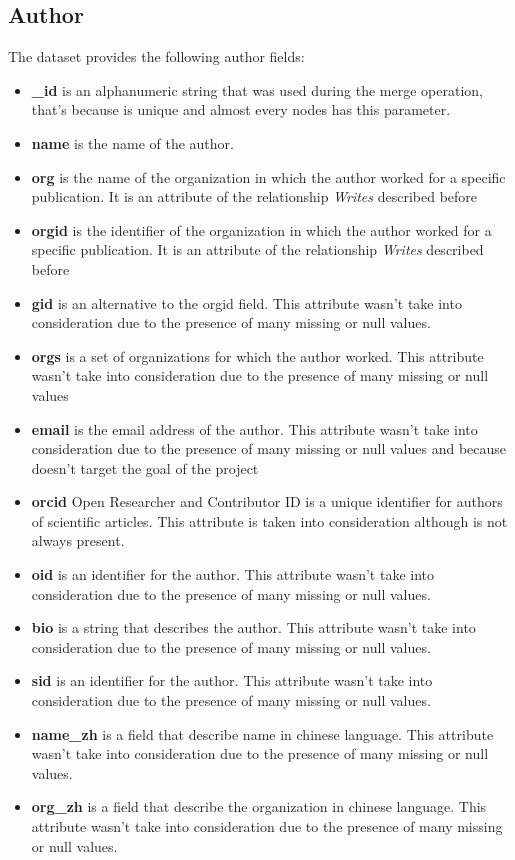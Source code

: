 \documentclass{Configuration_Files/PoliMi3i_thesis}
\begin{document}
\subsection{Author}
The dataset provides the following author fields:
\begin{itemize}
    \item \textbf{\_id} is an alphanumeric string that was used during the merge operation, that's because is unique and
            almost every nodes has this parameter.
    \item \textbf{name} is the name of the author.
    \item \textbf{org} is the name of the organization in which the author worked for a specific publication. It is an attribute
            of the relationship \emph{Writes} described before
    \item \textbf{orgid} is the identifier of the organization in which the author worked for a specific publication. It is an
            attribute of the relationship \emph{Writes} described before
    \item \textbf{gid} is an alternative to the orgid field. This attribute wasn't take into consideration due to the presence of many missing or null values.
    \item \textbf{orgs} is a set of organizations for which the author worked. This attribute wasn't take into  consideration
        due to the presence of many missing or null values
    \item \textbf{email} is the email address of the author. This attribute wasn't take into
            consideration due to the presence of many missing or null values and because doesn't target the goal of the 
            project
    \item \textbf{orcid} Open Researcher and Contributor ID is a unique identifier for authors of scientific articles.
            This attribute is taken into consideration although is not always present.
    \item \textbf{oid} is an identifier for the author. This attribute wasn't take into consideration due to the
            presence of many missing or null values.
    \item \textbf{bio} is a string that describes the author. This attribute wasn't take into consideration due to 
            the presence of many missing or null values.
    \item \textbf{sid} is an identifier for the author. This attribute wasn't take into consideration due to the
            presence of many missing or null values.
    \item \textbf{name\_zh} is a field that describe name in chinese language. This attribute wasn't take
            into consideration due to the presence of many missing or null values.
    \item \textbf{org\_zh} is a field that describe the organization in chinese language. This attribute
            wasn't take into consideration due to the presence of many missing or null values.
\end{itemize}
\bigskip
\end{document}
